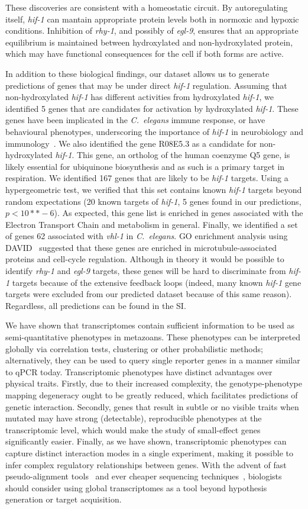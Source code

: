 \documentclass[9pt,twocolumn,twoside]{pnas-new}
\newcommand{\cel}{\emph{C.~elegans}}
\newcommand{\egl}{\emph{egl-9}}
\newcommand{\rhy}{\emph{rhy-1}}
\newcommand{\vhl}{\emph{vhl-1}}
\newcommand{\hif}{\emph{hif-1}}
\begin{document}
These discoveries are consistent with a homeostatic circuit. By autoregulating itself, \hif{} can mantain appropriate protein levels both in normoxic and hypoxic conditions. Inhibition of \rhy{}, and possibly of \egl{}, ensures that an appropriate equilibrium is maintained between hydroxylated and non-hydroxylated protein, which may have functional consequences for the cell if both forms are active.

In addition to these biological findings, our dataset allows us to generate predictions of genes that may be under direct \hif{} regulation. Assuming that non-hydroxylated \hif{} has different activities from hydroxylated \hif{}, we identified 5 genes that are candidates for activation by hydroxylated \hif{}. These genes have been implicated in the \cel{} immune response, or have behavioural phenotypes, underscoring the importance of \hif{} in neurobiology and immunology~\cite{}.
We also identified the gene R08E5.3 as a candidate for non-hydroxylated \hif{}. This gene, an ortholog of the human coenzyme Q5 gene, is likely essential for ubiquinone biosynthesis and as such is a primary target in respiration. We identified 167 genes that are likely to be \hif{} targets. Using a hypergeometric test, we verified that this set contains known \hif{} targets beyond random expectations (20 known targets of \hif{}, 5 genes found in our predictions, $p < 10**-6$). As expected, this gene list is enriched in genes associated with the Electron Transport Chain and metabolism in general.
Finally, we identified a set of genes 62 associated with \vhl{} in \cel{}. GO enrichment analysis using DAVID~\cite{} suggested that these genes are enriched in microtubule-associated proteins and cell-cycle regulation. Although in theory it would be possible to identify \rhy{} and \egl{} targets, these genes will be hard to discriminate from \hif{} targets because of the extensive feedback loops (indeed, many known \hif{} gene targets were excluded from our predicted dataset because of this same reason). Regardless, all predictions can be found in the SI.

We have shown that transcriptomes contain sufficient information to be used as semi-quantitative phenotypes in metazoans. These phenotypes can be interpreted globally via correlation tests, clustering or other probabilistic methods; alternatively, they can be used to query single reporter genes in a manner similar to qPCR today. Transcriptomic phenotypes have distinct advantages over physical traits. Firstly, due to their increased complexity, the genotype-phenotype mapping degeneracy ought to be greatly reduced, which facilitates predictions of genetic interaction. Secondly, genes that result in subtle or no visible traits when mutated may have strong (detectable), reproducible phenotypes at the transcriptomic level, which would make the study of small-effect genes significantly easier.
Finally, as we have shown, transcriptomic phenotypes can capture distinct interaction modes in a single experiment, making it possible to infer complex regulatory relationships between genes. With the advent of fast pseudo-alignment tools~\cite{} and ever cheaper sequencing techniques~\cite{}, biologists should consider using global transcriptomes as a tool beyond hypothesis generation or target acquisition.
\end{document}
